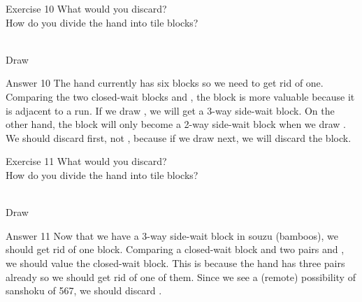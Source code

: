 \vfill

\begin{itembox}[l]{Exercise 10}
What would you discard? \\
\vsp
How do you divide the hand into tile blocks? 

\bp
{}\bei\bei~\\
\hfill\footnotesize{Draw~~~~~~~~~~~}
\ep
\end{itembox}

\newpage


\begin{itembox}[r]{Answer 10}
\emj
The hand currently has six blocks so we need to get rid of one. Comparing the two closed-wait blocks {\LARGE{}} and {\LARGE{}}, the {\LARGE{}} block is more valuable because it is adjacent to a run. If we draw {\LARGE{}}, we will get a 3-way side-wait block. On the other hand, the {\LARGE{}} block will only become a 2-way side-wait block when we draw {\LARGE{}}. We should discard {\LARGE{}} first, not {\LARGE{}}, because if we draw {\LARGE{}} next, we will discard the {\LARGE{}} block.
\end{itembox}

\vfill

\begin{itembox}[l]{Exercise 11}
What would you discard? \\
\vsp
How do you divide the hand into tile blocks? 

\bp
{}~\\
\hfill\footnotesize{Draw~~~~~~~~~~~}
\ep
\end{itembox}

\newpage


\begin{itembox}[r]{Answer 11}
\emj
Now that we have a 3-way side-wait block in {\jap souzu} (bamboos), we should get rid of one block. Comparing a closed-wait block {\LARGE{}} and two pairs {\LARGE{}} and {\LARGE{}}, we should value the closed-wait block. This is because the hand has three pairs already so we should get rid of one of them. Since we see a (remote) possibility of {\jap sanshoku} of 567, we should discard {\LARGE{}}. 
\end{itembox}


